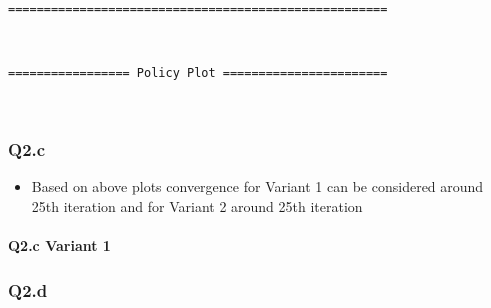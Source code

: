 \documentclass[11pt]{article}
\providecommand{\tightlist}{%
      \setlength{\itemsep}{0pt}\setlength{\parskip}{0pt}}
\begin{document}
    \begin{center}
    \end{center}
    { \hspace*{\fill} \\}
    
    \begin{Verbatim}[commandchars=\\\{\}]
=====================================================

    \end{Verbatim}

    \begin{center}
    \end{center}
    { \hspace*{\fill} \\}
    
    \begin{Verbatim}[commandchars=\\\{\}]
================= Policy Plot =======================

    \end{Verbatim}

    \begin{center}
    \end{center}
    { \hspace*{\fill} \\}
    
    \subsubsection{Q2.c}\label{q2.c}

\begin{itemize}
\tightlist
\item
  Based on above plots convergence for Variant 1 can be considered
  around 25th iteration and for Variant 2 around 25th iteration
\end{itemize}

\paragraph{Q2.c Variant 1}\label{q2.c-variant-1}

    \subsubsection{Q2.d}\label{q2.d}
\end{document}
